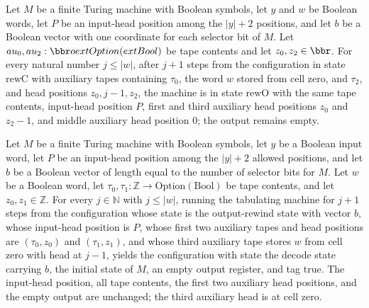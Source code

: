 \begin{theorem}
\label{Complexity.Meyer.rewC_run}
\leanok
{}
Let $M$ be a finite Turing machine with Boolean symbols, let $y$ and $w$ be Boolean
words, let $P$ be an input-head position among the $|y|+2$ positions, and let $b$ be a
Boolean vector with one coordinate for each selector bit of $M$. Let
$	au_0,	au_2:\bbr	o	ext{Option}(	ext{Bool})$ be tape contents and let $z_0,z_2\in\bbr$.
For every natural number $j\le |w|$, after $j+1$ steps from the configuration in state
$\mathrm{rewC}$ with auxiliary tapes containing $\tau_0$, the word $w$ stored from cell
zero, and $\tau_2$, and head positions $z_0,j-1,z_2$, the machine is in state
$\mathrm{rewO}$ with the same tape contents, input-head position $P$, first and third
auxiliary head positions $z_0$ and $z_2-1$, and middle auxiliary head position $0$; the
output remains empty.
\end{theorem}

\begin{theorem}
\label{Complexity.Meyer.rewO_run}
\leanok
{}
Let $M$ be a finite Turing machine with Boolean symbols, let $y$ be a Boolean input
word, let $P$ be an input-head position among the $|y|+2$ allowed positions, and let $b$
be a Boolean vector of length equal to the number of selector bits for $M$. Let $w$ be a
Boolean word, let $\tau_0,\tau_1:\mathbb{Z}\to\mathrm{Option}(\mathrm{Bool})$ be tape
contents, and let $z_0,z_1\in\mathbb{Z}$. For every $j\in\mathbb{N}$ with $j\le |w|$,
running the tabulating machine for $j+1$ steps from the configuration whose state is the
output-rewind state with vector $b$, whose input-head position is $P$, whose first two
auxiliary tapes and head positions are $(\tau_0,z_0)$ and $(\tau_1,z_1)$, and whose
third auxiliary tape stores $w$ from cell zero with head at $j-1$, yields the
configuration with state the decode state carrying $b$, the initial state of $M$, an
empty output register, and tag true. The input-head position, all tape contents, the
first two auxiliary head positions, and the empty output are unchanged; the third
auxiliary head is at cell zero.
\end{theorem}

